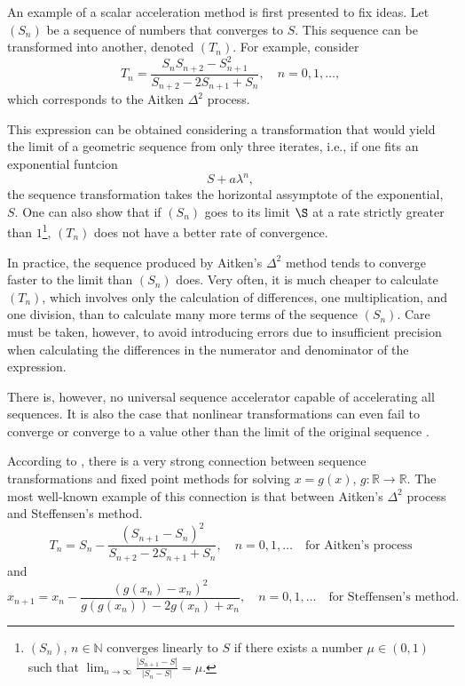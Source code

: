 An example of a scalar acceleration method is first presented to fix ideas.
Let \((S_n)\) be a sequence of numbers that converges to \(S\).
This sequence can be transformed into another, denoted \((T_n)\).
For example, consider
\begin{equation}
  T_n = \frac{S_n S_{n+2} - S^2_{n+1}}{S_{n+2}-2S_{n+1} + S_n},\quad n=0,1,\dots,
\end{equation}
which corresponds to the Aitken \(\Delta^2\) process.

This expression can be obtained considering a transformation that would yield the limit of a geometric sequence from only three iterates, i.e., if one fits an exponential funtcion
\begin{equation}
  S + a \lambda^n,
\end{equation}
the sequence transformation takes the horizontal assymptote of the exponential, \(S\).
One can also show that if \((S_n)\) goes to its limit \(\S\) at a rate strictly greater than \(1\)\footnote{$(S_{n})$, ${n \in \mathbb{N}}$ converges linearly to $S$ if there exists a number $\mu \in(0,1)$ such that \(\lim_{n \rightarrow \infty} \frac{\left|S_{n+1}-S\right|}{\left|S_{n}-S\right|}=\mu\).}, \((T_n)\) does not have a better rate of convergence.

In practice, the sequence produced by Aitken's \(\Delta^2\) method tends to converge faster to the limit than \((S_n)\) does.
Very often, it is much cheaper to calculate \((T_n)\), which involves only the calculation of differences, one multiplication, and one division, than to calculate many more terms of the sequence \((S_n)\).
Care must be taken, however, to avoid introducing errors due to insufficient precision when calculating the differences in the numerator and denominator of the expression.

There is, however, no universal sequence accelerator capable of accelerating all sequences.
It is also the case that nonlinear transformations can even fail to converge or converge to a value other than the limit of the original sequence \citep{brezinski_extrapolation_2013}.

According to \cite{brezinski_extrapolation_2013}, there is a very strong connection between sequence transformations and fixed point methods for solving \(x= g( x)\), \(g\colon \mathbb R\to \mathbb R\).
The most well-known example of this connection is that between Aitken's \(\Delta^{2}\) process and Steffensen's method.
\begin{equation}
T_{n}=S_{n}-\frac{\left(S_{n+1}-S_{n}\right)^{2}}{S_{n+2}-2 S_{n+1}+S_{n}}, \quad n=0,1, \ldots \quad\text{for Aitken's process}
\end{equation}
and
\begin{equation}
x_{n+1}=x_{n}-\frac{\left(g\left(x_{n}\right)-x_{n}\right)^{2}}{g\left(g\left(x_{n}\right)\right)-2 g\left(x_{n}\right)+x_{n}},\quad n=0,1, \ldots \quad\text{for Steffensen's method.}
\end{equation}


